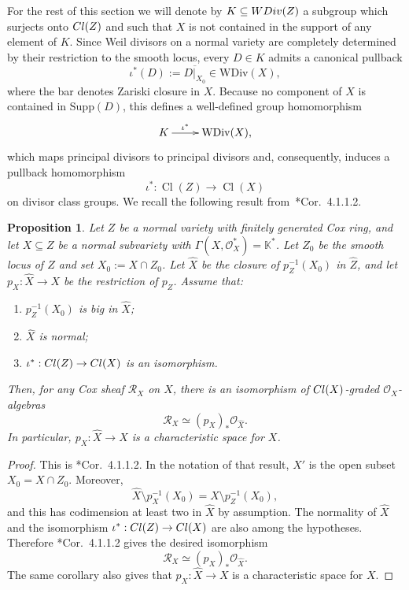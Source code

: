 \documentclass{amsart}
\newtheorem{proposition}[theorem]{Proposition}
\theoremstyle{definition}
\theoremstyle{remark}
\begin{document}
For the rest of this section we will denote by
$K \subseteq {\rm WDiv}(Z)$ a subgroup which surjects onto ${\rm Cl}(Z)$ and such that $X$ is not contained in the support of any element of $K$.
Since Weil divisors on a normal variety are completely determined by their restriction to the smooth locus, every $D \in K$ admits a canonical pullback
\[
\iota^*(D) := \overline{D|_{X_0}} \in \mathrm{WDiv}(X),
\]
where the bar denotes Zariski closure in $X$.
Because no component of $X$ is contained in $\mathrm{Supp}(D)$, this defines a well-defined group homomorphism
\[
\xymatrix{
 K \ar[r]^-{\iota^*} &
 \operatorname{WDiv}(X),
}
\]
which maps principal divisors to principal divisors and, consequently, induces a pullback homomorphism
\[
\iota^* \colon \operatorname{Cl}(Z) \longrightarrow \operatorname{Cl}(X)
\]
on divisor class groups. We recall the following result from~\cite{adhl}*{Cor.~4.1.1.2}.

\begin{proposition}
\label{pro:sheaf}
Let $Z$ be a normal variety with finitely generated Cox ring, and let
$X\subseteq Z$ be a normal subvariety with
$\Gamma(X,\mathcal O_X^*)=\mathbb K^*$.
Let $Z_0$ be the smooth locus of $Z$ and set $X_0:=X\cap Z_0$.
Let $\widehat X$ be the closure of $p_Z^{-1}(X_0)$ in $\widehat Z$, and let
$p_X:\widehat X\to X$ be the restriction of $p_Z$.
Assume that:
\begin{enumerate}
\item $p_Z^{-1}(X_0)$ is big in $\widehat X$;
\item $\widehat X$ is normal;
\item $\iota^*:{\rm Cl}(Z)\to{\rm Cl}(X)$ is an isomorphism.
\end{enumerate}
Then, for any Cox sheaf $\mathcal R_X$ on $X$, there is an isomorphism of
${\rm Cl}(X)$-graded $\mathcal{O}_X$-algebras
\[
 \mathcal{R}_X \simeq (p_X)_* \mathcal{O}_{\widehat{X}}.
\]
In particular, $p_X:\widehat X\to X$ is a characteristic space for $X$.
\end{proposition}

\begin{proof}
This is \cite{adhl}*{Cor.~4.1.1.2}. In the notation of that result,
$X'$ is the open subset $X_0=X\cap Z_0$. Moreover,
\[
 \widehat X\setminus p_X^{-1}(X_0)
 =
 \widehat X\setminus p_Z^{-1}(X_0),
\]
and this has codimension at least two in $\widehat X$ by assumption. The normality of $\widehat X$ and the isomorphism
$\iota^*:{\rm Cl}(Z)\to{\rm Cl}(X)$ are also among the hypotheses. Therefore
\cite{adhl}*{Cor.~4.1.1.2} gives the desired isomorphism
\[
 \mathcal R_X \simeq (p_X)_*\mathcal O_{\widehat X}.
\]
The same corollary also gives that $p_X:\widehat X\to X$ is a characteristic space for $X$.
\end{proof}
\end{document}
